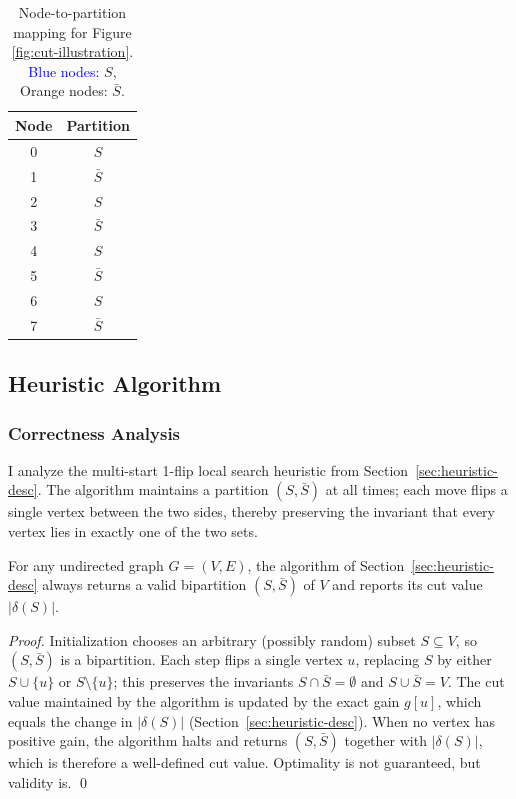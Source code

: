 \documentclass[12pt]{article}
\begin{document}
\begin{table}[H]
    \centering
    \begin{tabular}{|c|c|}
        \hline
        \textbf{Node} & \textbf{Partition} \\
        \hline
        0 & $S$ \\
        1 & $\bar{S}$ \\
        2 & $S$ \\
        3 & $\bar{S}$ \\
        4 & $S$ \\
        5 & $\bar{S}$ \\
        6 & $S$ \\
        7 & $\bar{S}$ \\
        \hline
    \end{tabular}
    \caption{Node-to-partition mapping for Figure \ref{fig:cut-illustration}. \textcolor{blue}{Blue nodes}: $S$, \textcolor{orange!60!black}{Orange nodes}: $\bar{S}$.}
    \label{tab:node-partition}
\end{table}
\subsection{Heuristic Algorithm}
\label{sec:heuristic-complexity}
\subsubsection{Correctness Analysis}

I analyze the multi-start 1-flip local search heuristic from Section~\ref{sec:heuristic-desc}. The algorithm maintains a partition $(S,\bar S)$ at all times; each move flips a single vertex between the two sides, thereby preserving the invariant that every vertex lies in exactly one of the two sets.

\begin{theorem}
For any undirected graph $G=(V,E)$, the algorithm of Section~\ref{sec:heuristic-desc} always returns a valid bipartition $(S,\bar S)$ of $V$ and reports its cut value $|\delta(S)|$.
\end{theorem}

\begin{proof}
Initialization chooses an arbitrary (possibly random) subset $S\subseteq V$, so $(S,\bar S)$ is a bipartition. Each step flips a single vertex $u$, replacing $S$ by either $S\cup\{u\}$ or $S\setminus\{u\}$; this preserves the invariants $S\cap\bar S=\emptyset$ and $S\cup\bar S=V$. The cut value maintained by the algorithm is updated by the exact gain $g[u]$, which equals the change in $|\delta(S)|$ (Section~\ref{sec:heuristic-desc}). When no vertex has positive gain, the algorithm halts and returns $(S,\bar S)$ together with $|\delta(S)|$, which is therefore a well-defined cut value. Optimality is not guaranteed, but validity is. \qed
\end{proof}
\end{document}
